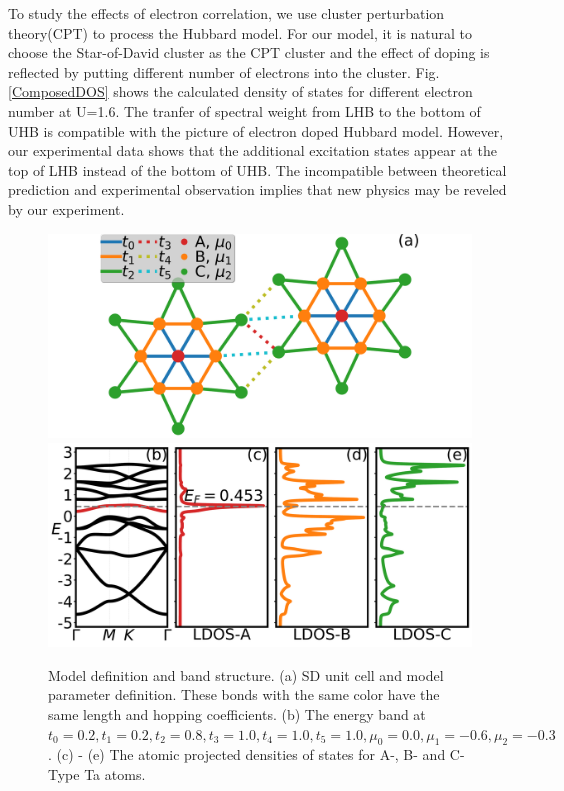 \documentclass[aps,prl,twocolumn,superscriptaddress]{revtex4}
\begin{document}
To study the effects of electron correlation, we use cluster perturbation theory(CPT) \cite{PhysRevB.48.418,PhysRevLett.84.522} to process the Hubbard model. For our model, it is natural to choose the Star-of-David cluster as the CPT cluster and the effect of doping is reflected by putting different number of electrons into the cluster. Fig. \ref{ComposedDOS} shows the calculated density of states for different electron number at U=1.6. The tranfer of spectral weight from LHB to the bottom of UHB is compatible with the picture of electron doped Hubbard model. However, our experimental data shows that the additional excitation states appear at the top of LHB instead of the bottom of UHB. The incompatible between theoretical prediction and experimental observation implies that new physics may be reveled by our experiment.

\begin{figure}
    \includegraphics[width=\columnwidth]{StarOfDavidTB.pdf}
    \includegraphics[width=\columnwidth]{EBAndDoS.pdf}
    \caption{\label{TBModel}Model definition and band structure. (a) SD unit cell and model parameter definition. These bonds with the same color have the same length and hopping coefficients. (b) The energy band at $t_0=0.2, t_1=0.2, t_2=0.8, t_3=1.0, t_4=1.0, t_5=1.0, \mu_0=0.0 ,\mu_1=-0.6, \mu_2=-0.3$. (c) - (e) The atomic projected densities of states for A-, B- and C-Type Ta atoms.}
\end{figure}
\end{document}
